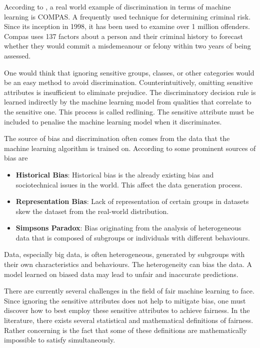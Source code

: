 According to \citet{Dressel:2018:AAAS}, a real world example of discrimination in terms of machine learning is COMPAS. A frequently used technique for determining criminal risk. Since its inception in 1998, it has been used to examine over 1 million offenders. Compas uses 137 factors about a person and their criminal history to forecast whether they would commit a misdemeanour or felony within two years of being assessed.

One would think that ignoring sensitive groups, classes, or other categories would be an easy method to avoid discrimination. Counterintuitively, omitting sensitive attributes is insufficient to eliminate prejudice. The discriminatory decision rule is learned indirectly by the machine learning model from qualities that correlate to the sensitive one. \citep{Dressel:2018:AAAS, Calders:20210:DMKD} This process is called redlining. The sensitive attribute must be included to penalise the machine learning model when it discriminates.

The source of bias and discrimination often comes from the data that the machine learning algorithm is trained on. According to \citet{Mehrabi:2021:CSUR} some prominent sources of bias are

\begin{itemize}
    \item \textbf{Historical Bias}: Historical bias is the already existing bias and sociotechnical issues in the world. This affect the data generation process.
    \item \textbf{Representation Bias}: Lack of representation of certain groups in datasets skew the dataset from the real-world distribution.
    \item \textbf{Simpsons Paradox}: Bias originating from the analysis of heterogeneous data that is composed of subgroups or individuals with different behaviours.
\end{itemize}

Data, especially big data, is often heterogeneous, generated by subgroups with their own characteristics and behaviours. The heterogeneity can bias the data. A model learned on biased data may lead to unfair and inaccurate predictions.

There are currently several challenges in the field of fair machine learning to face. Since ignoring the sensitive attributes does not help to mitigate bias, one must discover how to best employ these sensitive attributes to achieve fairness. In the literature, there exists several statistical and mathematical definitions of fairness. Rather concerning is the fact that some of these definitions are mathematically impossible to satisfy simultaneously. \citep{Kleinberg:2017:LIPIcs}

